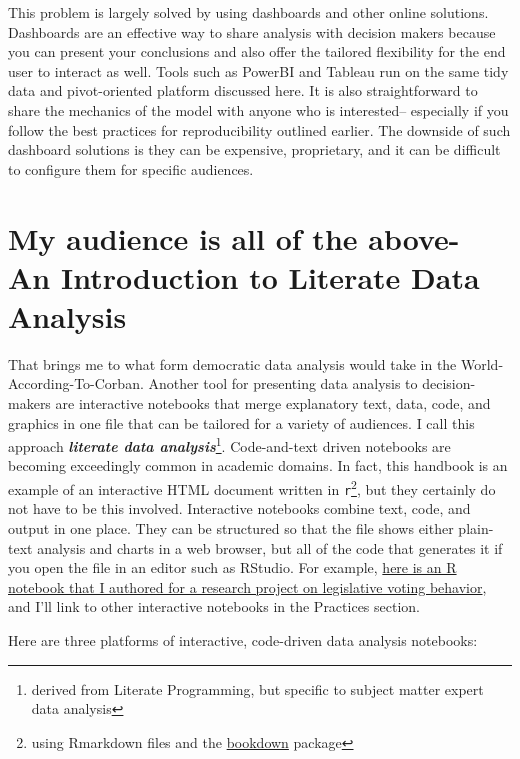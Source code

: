 \documentclass[]{book}
\begin{document}
This problem is largely solved by using dashboards and other online solutions. Dashboards are an effective way to share analysis with decision makers because you can present your conclusions and also offer the tailored flexibility for the end user to interact as well. Tools such as PowerBI and Tableau run on the same tidy data and pivot-oriented platform discussed here. It is also straightforward to share the mechanics of the model with anyone who is interested-- especially if you follow the best practices for reproducibility outlined earlier. The downside of such dashboard solutions is they can be expensive, proprietary, and it can be difficult to configure them for specific audiences.

\hypertarget{my-audience-is-all-of-the-above--an-introduction-to-literate-data-analysis}{%
\section{My audience is all of the above- An Introduction to Literate Data Analysis}\label{my-audience-is-all-of-the-above--an-introduction-to-literate-data-analysis}}

That brings me to what form democratic data analysis would take in the World-According-To-Corban. Another tool for presenting data analysis to decision-makers are interactive notebooks that merge explanatory text, data, code, and graphics in one file that can be tailored for a variety of audiences. I call this approach \textbf{\emph{literate data analysis}}\footnote{derived from Literate Programming, but specific to subject matter expert data analysis}. Code-and-text driven notebooks are becoming exceedingly common in academic domains. In fact, this handbook is an example of an interactive HTML document written in \texttt{r}\footnote{using Rmarkdown files and the \href{bookdown.org}{bookdown} package}, but they certainly do not have to be this involved. Interactive notebooks combine text, code, and output in one place. They can be structured so that the file shows either plain-text analysis and charts in a web browser, but all of the code that generates it if you open the file in an editor such as RStudio. For example, \href{https://nemethc.com/evaluating_legislator_efficiency.nb.html\#}{here is an R notebook that I authored for a research project on legislative voting behavior}, and I'll link to other interactive notebooks in the Practices section.

Here are three platforms of interactive, code-driven data analysis notebooks:
\end{document}
